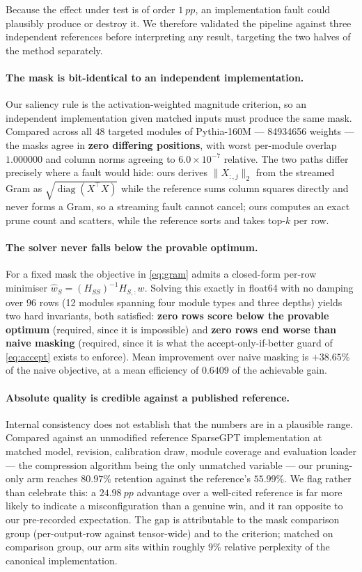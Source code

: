 Because the effect under test is of order $\SI{1}{pp}$, an implementation fault could plausibly
produce or destroy it. We therefore validated the pipeline against three independent
references before interpreting any result, targeting the two halves of the method separately.

\paragraph{The mask is bit-identical to an independent implementation.} Our saliency rule is
the activation-weighted magnitude criterion, so an independent implementation given matched
inputs must produce the same mask. Compared across all $48$ targeted modules of Pythia-160M
--- \num{84934656} weights --- the masks agree in \textbf{zero differing positions}, with
worst per-module overlap $1.000000$ and column norms agreeing to $6.0 \times 10^{-7}$
relative. The two paths differ precisely where a fault would hide: ours derives
$\lVert X_{:,j}\rVert_2$ from the streamed Gram as $\sqrt{\operatorname{diag}(X^\top X)}$
while the reference sums column squares directly and never forms a Gram, so a streaming
fault cannot cancel; ours computes an exact prune count and scatters, while the reference
sorts and takes top-$k$ per row.

\paragraph{The solver never falls below the provable optimum.} For a fixed mask the objective
in \eqref{eq:gram} admits a closed-form per-row minimiser $\hat{w}_S = (H_{SS})^{-1}H_{S,:}w$.
Solving this exactly in float64 with no damping over $96$ rows (12 modules spanning four
module types and three depths) yields two hard invariants, both satisfied: \textbf{zero rows
score below the provable optimum} (required, since it is impossible) and \textbf{zero rows end
worse than naive masking} (required, since it is what the accept-only-if-better guard of
\eqref{eq:accept} exists to enforce). Mean improvement over naive masking is $+38.65\%$ of the
naive objective, at a mean efficiency of $0.6409$ of the achievable gain.

\paragraph{Absolute quality is credible against a published reference.} Internal consistency
does not establish that the numbers are in a plausible range. Compared against an unmodified
reference SparseGPT implementation at matched model, revision, calibration draw, module
coverage and evaluation loader --- the compression algorithm being the only unmatched
variable --- our pruning-only arm reaches $80.97\%$ retention against the reference's
$55.99\%$. We flag rather than celebrate this: a $\SI{24.98}{pp}$ advantage over a well-cited
reference is far more likely to indicate a misconfiguration than a genuine win, and it ran
opposite to our pre-recorded expectation. The gap is attributable to the mask comparison
group (per-output-row against tensor-wide) and to the criterion; matched on comparison group,
our arm sits within roughly $9\%$ relative perplexity of the canonical implementation.

